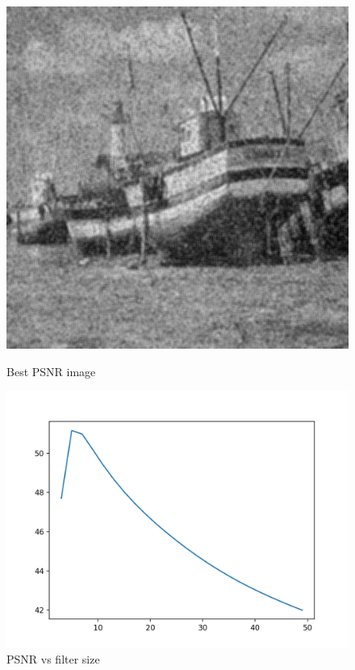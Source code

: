\documentclass{article}
\begin{document}
    \begin{figure}[!htb]
      \includegraphics[scale=0.3]{./basic_denoising/boat/average_best_sp.png}
      \caption{Best PSNR image}
    \endminipage \hfill
      \includegraphics[scale=.45]{./basic_denoising/boat/average_psnr_sp.png}
      \caption{PSNR vs filter size}
    \endminipage
    \end{figure}
    
\end{document}

